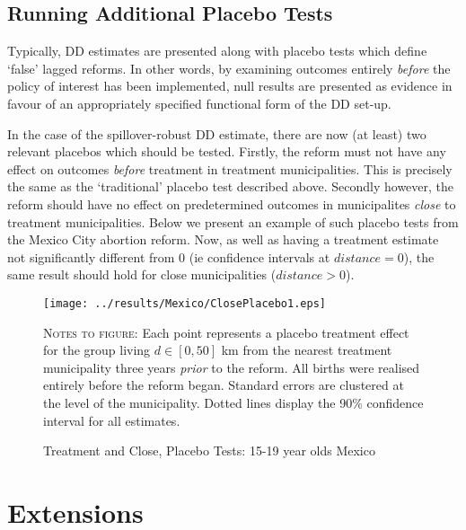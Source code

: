 \documentclass{article}
\begin{document}
\begin{spacing}{1.1}
\subsection{Running Additional Placebo Tests}
Typically, DD estimates are presented along with placebo tests which define `false'
lagged reforms.  In other words, by examining outcomes entirely \emph{before} the
policy of interest has been implemented, null results are presented as evidence
in favour of an appropriately specified functional form of the DD set-up.

In the case of the spillover-robust DD estimate, there are now (at least) two
relevant placebos which should be tested.  Firstly, the reform must not have any
effect on outcomes \emph{before} treatment in treatment municipalities.  This is
precisely the same as the `traditional' placebo test described above.  Secondly
however, the reform should have no effect on predetermined outcomes in municipalites
\emph{close} to treatment municipalities.  Below we present an example of such 
placebo tests from the Mexico City abortion reform.  Now, as well as having a 
treatment estimate not significantly different from 0 (ie confidence intervals
at $distance=0$), the same result should hold for close municipalities ($distance>0$).
\begin{figure}[htpb!]
\texttt{[image: ../results/Mexico/ClosePlacebo1.eps]}
\caption{Treatment and Close, Placebo Tests: 15-19 year olds Mexico}
\label{SFig:MexClose}
\vspace{2mm}
\begin{footnotesize}
\textsc{Notes to figure}: Each point represents a placebo treatment effect for the 
group living $d\in [0,50]$ km from the nearest treatment municipality three years
\emph{prior} to the reform.  All births were realised entirely before the reform
began.  Standard errors are clustered at the level of the municipality.  Dotted 
lines display the 90\% confidence interval for all estimates.
\end{footnotesize}
\end{figure}


\section{Extensions}
\label{Sscn:extend}

\end{spacing}
\end{document}
